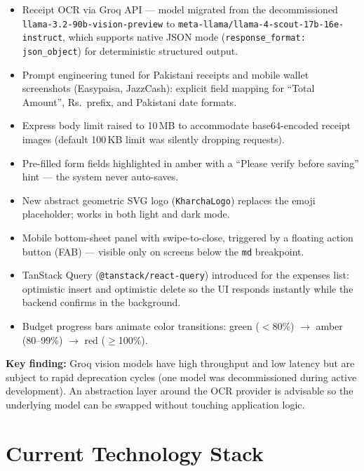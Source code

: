\documentclass[11pt,a4paper]{article}
\begin{document}
\begin{itemize}[leftmargin=1.2cm]
  \item Receipt OCR via Groq API — model migrated from the decommissioned
        \texttt{llama-3.2-90b-vision-preview} to
        \texttt{meta-llama/llama-4-scout-17b-16e-instruct}, which supports
        native JSON mode (\texttt{response\_format: json\_object}) for
        deterministic structured output.
  \item Prompt engineering tuned for Pakistani receipts and mobile wallet
        screenshots (Easypaisa, JazzCash): explicit field mapping for
        ``Total Amount'', Rs.\ prefix, and Pakistani date formats.
  \item Express body limit raised to 10\,MB to accommodate base64-encoded
        receipt images (default 100\,KB limit was silently dropping requests).
  \item Pre-filled form fields highlighted in amber with a
        ``Please verify before saving'' hint — the system never auto-saves.
  \item New abstract geometric SVG logo (\texttt{KharchaLogo}) replaces the
        emoji placeholder; works in both light and dark mode.
  \item Mobile bottom-sheet panel with swipe-to-close, triggered by a floating
        action button (FAB) — visible only on screens below the \texttt{md}
        breakpoint.
  \item TanStack Query (\texttt{@tanstack/react-query}) introduced for the
        expenses list: optimistic insert and optimistic delete so the UI
        responds instantly while the backend confirms in the background.
  \item Budget progress bars animate color transitions:
        green ($<$80\%) $\to$ amber (80--99\%) $\to$ red ($\geq$100\%).
\end{itemize}

\textbf{Key finding:} Groq vision models have high throughput and low latency
but are subject to rapid deprecation cycles (one model was decommissioned during
active development). An abstraction layer around the OCR provider is advisable
so the underlying model can be swapped without touching application logic.

\section{Current Technology Stack}
\end{document}
